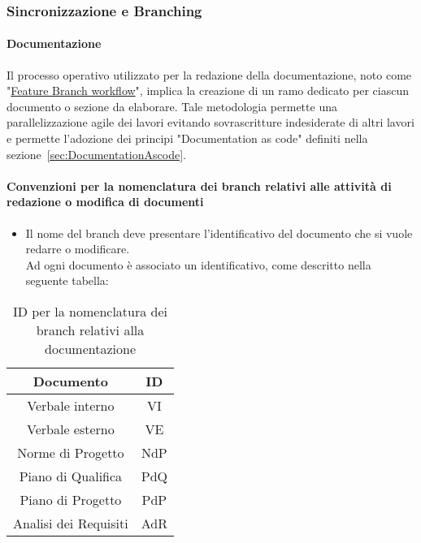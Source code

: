 \hypertarget{subsubsec:sincronizzazione&branching}{\subsubsection{Sincronizzazione e Branching}}
\paragraph{Documentazione}
Il processo operativo utilizzato per la redazione della documentazione, noto come "\href{https://www.atlassian.com/git/tutorials/comparing-workflows/feature-branch-workflow}{Feature Branch workflow}", implica la creazione di un ramo dedicato per ciascun documento o sezione da elaborare.
Tale metodologia permette una parallelizzazione agile dei lavori evitando sovrascritture indesiderate di altri lavori e permette l'adozione dei principi "Documentation as code" definiti nella sezione~\ref{sec:DocumentationAscode}. \\ 

\paragraph*{\hypertarget{par:convezioninomenclaturabranchdocumenti}{\textbf{Convenzioni per la nomenclatura dei branch relativi alle attività di redazione o modifica di documenti}}}

\begin{itemize}
    \item Il nome del branch deve presentare l'identificativo del documento che si vuole redarre o modificare. \\
    Ad ogni documento è associato un identificativo, come descritto nella seguente tabella:
\end{itemize}

\begin{table}[H]
    \centering
    \begin{tabular}{|c|c|}
        \hline
        Documento & ID \\
        \hline
        Verbale interno & VI \\
        Verbale esterno & VE \\
        Norme di Progetto & NdP \\
        Piano di Qualifica & PdQ \\
        Piano di Progetto & PdP \\ 
        Analisi dei Requisiti & AdR \\
        \hline
    \end{tabular}
    \caption{ID per la nomenclatura dei branch relativi alla documentazione}
\end{table}

